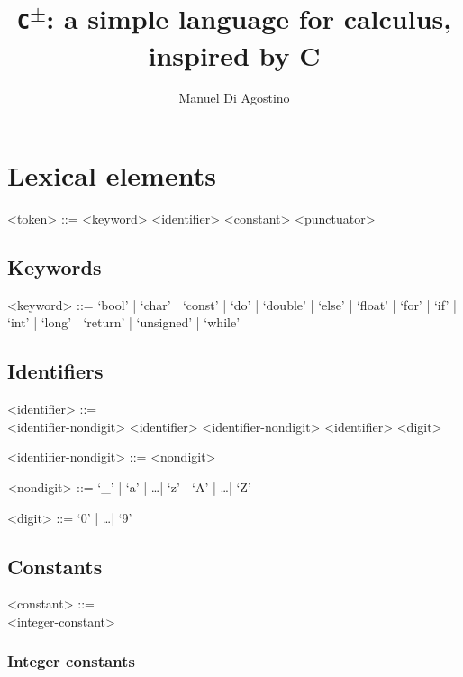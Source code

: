 \documentclass[a4paper]{article}
\title{\Huge{\texttt{C\textsuperscript{$\pm$}}: a simple language for calculus, inspired by C}}
\author{Manuel Di Agostino}
\begin{document}
\maketitle

\section{Lexical elements}
\begin{grammar}

	<token> ::= <keyword>
		\alt <identifier>
		\alt <constant>
		\alt <string-literal>
		\alt <punctuator>
	
\end{grammar}

\subsection{Keywords}

\begin{grammar}
	<keyword> ::=  `bool' | `char' | `const' | `do' | `double' | `else' | `float' | `for' | `if' | `int' | `long' | `return' | `unsigned' | `while'
\end{grammar}

\subsection{Identifiers}

\begin{grammar}
	<identifier> ::= \hfill \\
		<identifier-nondigit>
		\alt <identifier> <identifier-nondigit>
		\alt <identifier> <digit>

	<identifier-nondigit> ::= <nondigit>

	<nondigit> ::= `_' | `a' | \dots | `z' | `A' | \dots | `Z'

	<digit> ::= `0' | \dots | `9'
\end{grammar}

\subsection{Constants}

\begin{grammar}
	<constant> ::= \hfill \\
		<integer-constant>
		\alt <floating-constant>
		\alt <character-constant>
\end{grammar}

\subsubsection{Integer constants}
\end{document}
